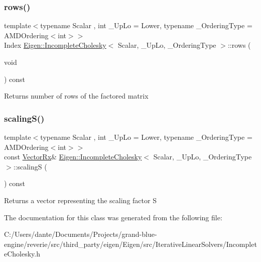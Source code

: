 \subsubsection{\texorpdfstring{rows()}{rows()}}
{\footnotesize\ttfamily template$<$typename Scalar , int \+\_\+\+Up\+Lo = Lower, typename \+\_\+\+Ordering\+Type  = A\+M\+D\+Ordering$<$int$>$$>$ \\
Index \mbox{\hyperlink{class_eigen_1_1_incomplete_cholesky}{Eigen\+::\+Incomplete\+Cholesky}}$<$ Scalar, \+\_\+\+Up\+Lo, \+\_\+\+Ordering\+Type $>$\+::rows (\begin{DoxyParamCaption}\item[{void}]{ }\end{DoxyParamCaption}) const\hspace{0.3cm}{\ttfamily [inline]}}

\begin{DoxyReturn}{Returns}
number of rows of the factored matrix 
\end{DoxyReturn}
\mbox{\label{class_eigen_1_1_incomplete_cholesky_a30d66dd77147a84ec3302e7d5fe5d924}} 
\subsubsection{\texorpdfstring{scalingS()}{scalingS()}}
{\footnotesize\ttfamily template$<$typename Scalar , int \+\_\+\+Up\+Lo = Lower, typename \+\_\+\+Ordering\+Type  = A\+M\+D\+Ordering$<$int$>$$>$ \\
const \mbox{\hyperlink{class_eigen_1_1_matrix}{Vector\+Rx}}\& \mbox{\hyperlink{class_eigen_1_1_incomplete_cholesky}{Eigen\+::\+Incomplete\+Cholesky}}$<$ Scalar, \+\_\+\+Up\+Lo, \+\_\+\+Ordering\+Type $>$\+::scalingS (\begin{DoxyParamCaption}{ }\end{DoxyParamCaption}) const\hspace{0.3cm}{\ttfamily [inline]}}

\begin{DoxyReturn}{Returns}
a vector representing the scaling factor S 
\end{DoxyReturn}


The documentation for this class was generated from the following file\+:\begin{DoxyCompactItemize}
\item 
C\+:/\+Users/dante/\+Documents/\+Projects/grand-\/blue-\/engine/reverie/src/third\+\_\+party/eigen/\+Eigen/src/\+Iterative\+Linear\+Solvers/Incomplete\+Cholesky.\+h\end{DoxyCompactItemize}
